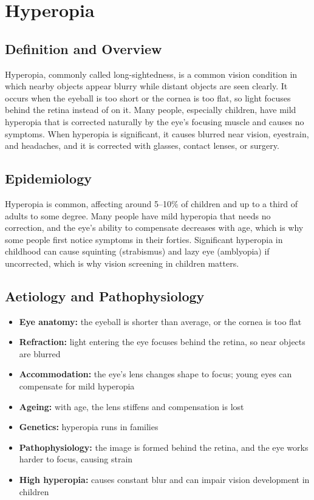 \chapter{Hyperopia}

\section*{Definition and Overview}
Hyperopia, commonly called long-sightedness, is a common vision condition in which nearby objects appear blurry while distant objects are seen clearly. It occurs when the eyeball is too short or the cornea is too flat, so light focuses behind the retina instead of on it. Many people, especially children, have mild hyperopia that is corrected naturally by the eye's focusing muscle and causes no symptoms. When hyperopia is significant, it causes blurred near vision, eyestrain, and headaches, and it is corrected with glasses, contact lenses, or surgery.

\section*{Epidemiology}
Hyperopia is common, affecting around 5--10\% of children and up to a third of adults to some degree. Many people have mild hyperopia that needs no correction, and the eye's ability to compensate decreases with age, which is why some people first notice symptoms in their forties. Significant hyperopia in childhood can cause squinting (strabismus) and lazy eye (amblyopia) if uncorrected, which is why vision screening in children matters.

\section*{Aetiology and Pathophysiology}
\begin{itemize}
    \item \textbf{Eye anatomy:} the eyeball is shorter than average, or the cornea is too flat
    \item \textbf{Refraction:} light entering the eye focuses behind the retina, so near objects are blurred
    \item \textbf{Accommodation:} the eye's lens changes shape to focus; young eyes can compensate for mild hyperopia
    \item \textbf{Ageing:} with age, the lens stiffens and compensation is lost
    \item \textbf{Genetics:} hyperopia runs in families
    \item \textbf{Pathophysiology:} the image is formed behind the retina, and the eye works harder to focus, causing strain
    \item \textbf{High hyperopia:} causes constant blur and can impair vision development in children
\end{itemize}

